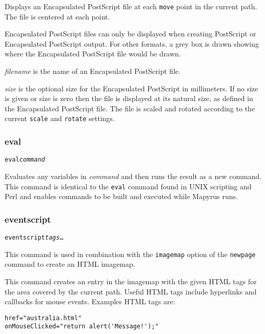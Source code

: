 Displays an Encapsulated PostScript file at each \texttt{move} point in
the current path.  The file is centered at each point.

Encapsulated PostScript files can only be displayed when creating
PostScript or Encapsulated PostScript output.  For other formats,
a grey box is drawn showing where the Encapsulated PostScript file
would be drawn.

\textit{filename} is the name of an Encapsulated PostScript file.

\textit{size} is the optional size for the Encapsulated PostScript
in millimeters.  If no size
is given or size is zero then the file is displayed at its natural size,
as defined in the Encapsulated PostScript file.
The file is scaled and rotated according to the current \texttt{scale}
and \texttt{rotate} settings.

\subsubsection{eval}

\begin{alltt}
eval \textit{command}
\end{alltt}

Evaluates any variables in \textit{command} and then
runs the result as a new command.
This command is identical to the \texttt{eval} command found in
UNIX scripting and Perl and
enables commands to be built and executed while Mapyrus runs.

\subsubsection{eventscript}

\begin{alltt}
eventscript \textit{tags} \ldots
\end{alltt}

This command is used in combination with the \texttt{imagemap}
option of the \texttt{newpage} command to create an HTML imagemap.

This command creates an entry in the imagemap with the given HTML tags
for the area covered by the current path.
Useful HTML tags include hyperlinks and callbacks for mouse events.
Examples HTML tags are:

\begin{verbatim}
href="australia.html"
onMouseClicked="return alert('Message!');"
\end{verbatim}

